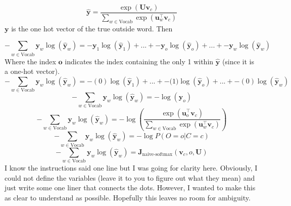 \documentclass[12pt]{article}
\begin{document}
\begin{equation*}
    \hat{\bm y} = 
    \frac{\exp(\bm U \bm v_c)}{\sum_{w \in \text{Vocab}} \exp(\bm u_{w}^\top \bm v_c)}
\end{equation*}
$\bm y$ is the one hot vector of the true outside word. Then

\begin{equation*} 
    -\sum_{w \in \text{Vocab}} \bm y_w \log(\hat{\bm y}_w) = 
    \bm -\bm y_1 \log(\hat{\bm y}_1) + ... + -\bm y_o \log(\hat{\bm y}_o) + ... + -\bm y_w \log(\hat{\bm y}_w)
\end{equation*}    
Where the index $\bm o$ indicates the index containing the only 1 within $\hat {\bm y}$ (since it is a one-hot vector). 
\begin{equation*} 
    -\sum_{w \in \text{Vocab}} \bm y_w \log(\hat{\bm y}_w) = 
    \bm - (0)\log(\hat{\bm y}_1) + ... + -\bm (1) \log(\hat{\bm y}_o) + ... + - (0) \log(\hat{\bm y}_w)
\end{equation*}    
\begin{equation*} 
    -\sum_{w \in \text{Vocab}} \bm y_w \log(\hat{\bm y}_w) = 
    -\log(\hat{\bm y}_o)
\end{equation*}    
\begin{equation*} 
    -\sum_{w \in \text{Vocab}} \bm y_w \log(\hat{\bm y}_w) = 
    - \log(\frac{\exp(\bm u_o^\top \bm v_c)}{\sum_{w \in \text{Vocab}} \exp(\bm u_{w}^\top \bm v_c)})
\end{equation*}    
\begin{equation*} 
    -\sum_{w \in \text{Vocab}} \bm y_w \log(\hat{\bm y}_w) = 
    - \log P(O=o| C=c)
\end{equation*}   
\begin{equation*} 
    -\sum_{w \in \text{Vocab}} \bm y_w \log(\hat{\bm y}_w) = 
    \bm J_{\text{naive-softmax}}(\bm v_c, o, \bm U)
\end{equation*}     
I know the instructions said one line but I was going for clarity here. Obviously, I could not define
the variables (leave it to you to figure out what they mean) and just write some 
one liner that connects the dots. However, I wanted to make this as clear to understand as possible. 
Hopefully this leaves no room for ambiguity. 

\end{document}
